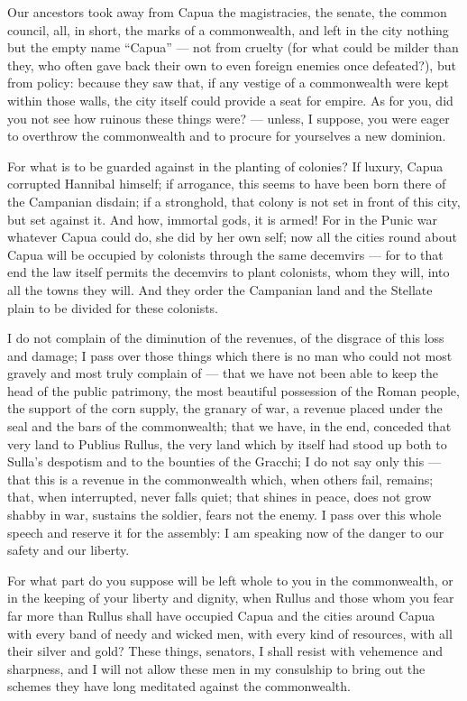  Our ancestors took away from Capua the magistracies, the senate, the common council, all, in short, the marks of a commonwealth, and left in the city nothing but the empty name ``Capua'' --- not from cruelty (for what could be milder than they, who often gave back their own to even foreign enemies once defeated?), but from policy: because they saw that, if any vestige of a commonwealth were kept within those walls, the city itself could provide a seat for empire. As for you, did you not see how ruinous these things were? --- unless, I suppose, you were eager to overthrow the commonwealth and to procure for yourselves a new dominion.

 For what is to be guarded against in the planting of colonies? If luxury, Capua corrupted Hannibal himself; if arrogance, this seems to have been born there of the Campanian disdain; if a stronghold, that colony is not set in front of this city, but set against it. And how, immortal gods, it is armed! For in the Punic war whatever Capua could do, she did by her own self; now all the cities round about Capua will be occupied by colonists through the same decemvirs --- for to that end the law itself permits the decemvirs to plant colonists, whom they will, into all the towns they will. And they order the Campanian land and the Stellate plain to be divided for these colonists.

 I do not complain of the diminution of the revenues, of the disgrace of this loss and damage; I pass over those things which there is no man who could not most gravely and most truly complain of --- that we have not been able to keep the head of the public patrimony, the most beautiful possession of the Roman people, the support of the corn supply, the granary of war, a revenue placed under the seal and the bars of the commonwealth; that we have, in the end, conceded that very land to Publius Rullus, the very land which by itself had stood up both to Sulla's despotism and to the bounties of the Gracchi; I do not say only this --- that this is a revenue in the commonwealth which, when others fail, remains; that, when interrupted, never falls quiet; that shines in peace, does not grow shabby in war, sustains the soldier, fears not the enemy. I pass over this whole speech and reserve it for the assembly: I am speaking now of the danger to our safety and our liberty.

 For what part do you suppose will be left whole to you in the commonwealth, or in the keeping of your liberty and dignity, when Rullus and those whom you fear far more than Rullus shall have occupied Capua and the cities around Capua with every band of needy and wicked men, with every kind of resources, with all their silver and gold? These things, senators, I shall resist with vehemence and sharpness, and I will not allow these men in my consulship to bring out the schemes they have long meditated against the commonwealth.


